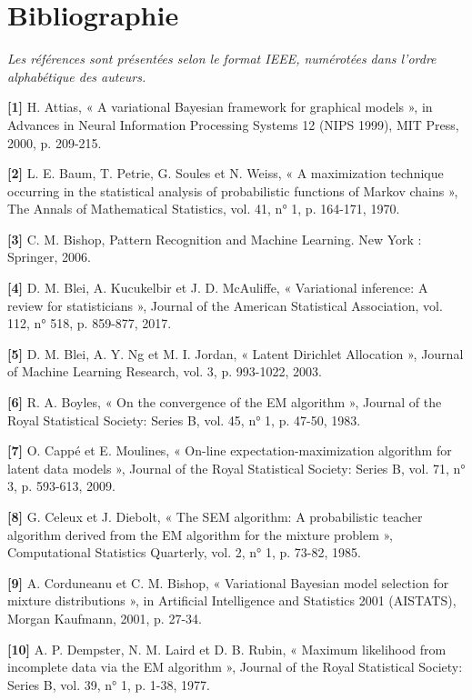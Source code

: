 \chapter*{Bibliographie}
\emph{Les références sont présentées selon le format IEEE, numérotées dans l'ordre alphabétique des auteurs.}

\textbf{[1]  }H. Attias, « A variational Bayesian framework for graphical models », in Advances in Neural Information Processing Systems 12 (NIPS 1999), MIT Press, 2000, p. 209-215.

\textbf{[2]  }L. E. Baum, T. Petrie, G. Soules et N. Weiss, « A maximization technique occurring in the statistical analysis of probabilistic functions of Markov chains », The Annals of Mathematical Statistics, vol. 41, n° 1, p. 164-171, 1970.

\textbf{[3]  }C. M. Bishop, Pattern Recognition and Machine Learning. New York : Springer, 2006.

\textbf{[4]  }D. M. Blei, A. Kucukelbir et J. D. McAuliffe, « Variational inference: A review for statisticians », Journal of the American Statistical Association, vol. 112, n° 518, p. 859-877, 2017.

\textbf{[5]  }D. M. Blei, A. Y. Ng et M. I. Jordan, « Latent Dirichlet Allocation », Journal of Machine Learning Research, vol. 3, p. 993-1022, 2003.

\textbf{[6]  }R. A. Boyles, « On the convergence of the EM algorithm », Journal of the Royal Statistical Society: Series B, vol. 45, n° 1, p. 47-50, 1983.

\textbf{[7]  }O. Cappé et E. Moulines, « On-line expectation-maximization algorithm for latent data models », Journal of the Royal Statistical Society: Series B, vol. 71, n° 3, p. 593-613, 2009.

\textbf{[8]  }G. Celeux et J. Diebolt, « The SEM algorithm: A probabilistic teacher algorithm derived from the EM algorithm for the mixture problem », Computational Statistics Quarterly, vol. 2, n° 1, p. 73-82, 1985.

\textbf{[9]  }A. Corduneanu et C. M. Bishop, « Variational Bayesian model selection for mixture distributions », in Artificial Intelligence and Statistics 2001 (AISTATS), Morgan Kaufmann, 2001, p. 27-34.

\textbf{[10]  }A. P. Dempster, N. M. Laird et D. B. Rubin, « Maximum likelihood from incomplete data via the EM algorithm », Journal of the Royal Statistical Society: Series B, vol. 39, n° 1, p. 1-38, 1977.

